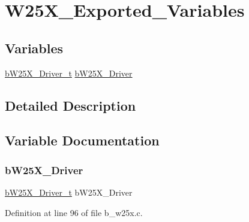 \hypertarget{group___w25_x___exported___variables}{}\section{W25\+X\+\_\+\+Exported\+\_\+\+Variables}
\label{group___w25_x___exported___variables}
\subsection*{Variables}
\begin{DoxyCompactItemize}
\item 
\mbox{\hyperlink{group___w25_x___exported___types_definitions_gadda45650bf6c5ce0216af3f25bb453dc}{b\+W25\+X\+\_\+\+Driver\+\_\+t}} \mbox{\hyperlink{group___w25_x___exported___variables_gaf32f0de405f6f704a717654d70349629}{b\+W25\+X\+\_\+\+Driver}}
\end{DoxyCompactItemize}


\subsection{Detailed Description}


\subsection{Variable Documentation}
\mbox{\label{group___w25_x___exported___variables_gaf32f0de405f6f704a717654d70349629}} 
\subsubsection{\texorpdfstring{b\+W25\+X\+\_\+\+Driver}{bW25X\_Driver}}
{\footnotesize\ttfamily \mbox{\hyperlink{group___w25_x___exported___types_definitions_gadda45650bf6c5ce0216af3f25bb453dc}{b\+W25\+X\+\_\+\+Driver\+\_\+t}} b\+W25\+X\+\_\+\+Driver}



Definition at line 96 of file b\+\_\+w25x.\+c.

